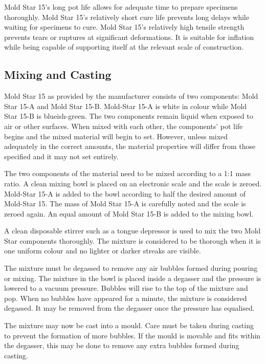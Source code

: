 Mold Star 15's long pot life allows for adequate time to prepare specimens thoroughly. Mold Star 15's relatively short cure life prevents long delays while waiting for specimens to cure. Mold Star 15's relatively high tensile strength prevents tears or ruptures at significant deformations. It is suitable for inflation while being capable of supporting itself at the relevant scale of construction. 

\subsection{Mixing and Casting}
\label{ssec:mac}

Mold Star 15 as provided by the manufacturer consists of two components: Mold Star 15-A and Mold Star 15-B. Mold-Star 15-A is white in colour while Mold Star 15-B is blueish-green. The two components remain liquid when exposed to air or other surfaces. When mixed with each other, the components' pot life begins and the mixed material will begin to set. However, unless mixed adequately in the correct amounts, the material properties will differ from those specified and it may not set entirely.

The two components of the material need to be mixed according to a 1:1 mass ratio. A clean mixing bowl is placed on an electronic scale and the scale is zeroed. Mold-Star 15-A is added to the bowl according to half the desired amount of Mold-Star 15. The mass of Mold Star 15-A is carefully noted and the scale is zeroed again. An equal amount of Mold Star 15-B is added to the mixing bowl.

A clean disposable stirrer such as a tongue depressor is used to mix the two Mold Star components thoroughly. The mixture is considered to be thorough when it is one uniform colour and no lighter or darker streaks are visible.

The mixture must be degassed to remove any air bubbles formed during pouring or mixing. The mixture in the bowl is placed inside a degasser and the pressure is lowered to a vacuum pressure. Bubbles will rise to the top of the mixture and pop. When no bubbles have appeared for a minute, the mixture is considered degassed. It may be removed from the degasser once the pressure has equalised.

The mixture may now be cast into a mould. Care must be taken during casting to prevent the formation of more bubbles. If the mould is movable and fits within the degasser, this may be done to remove any extra bubbles formed during casting.

